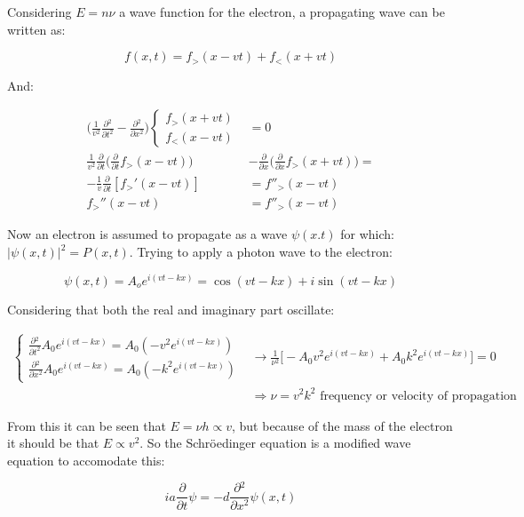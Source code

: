 Considering $E=n\nu$ a wave function for the electron, a propagating wave can be written as:

$$f(x,t) = f_>(x-vt)+f_<(x+vt)$$

And:

\begin{align*}
  \biggl(\frac{1}{v^2}\frac{\partial {^2}}{\partial {t^2}}-\frac{\partial {^2}}{\partial {x^2}}\biggr)\begin{cases}f_>(x+vt)\\f_<(x-vt)\end{cases} &= 0\\
  \frac{1}{v^2}\frac{\partial {}}{\partial {t}}\biggl(\frac{\partial {}}{\partial {t}}f_>(x-vt)\biggr)&-\frac{\partial {}}{\partial {x}}\biggl(\frac{\partial {}}{\partial {x}}f_>(x+vt)\biggr)=\\
  -\frac{1}{v}\frac{\partial {}}{\partial {t}}[f_>'(x-vt)]&=f''_>(x-vt)\\
  f_>''(x-vt) &=f''_>(x-vt)
\end{align*}

Now an electron is assumed to propagate as a wave $\psi(x.t)$ for which: $|\psi(x,t)|^2 = P(x,t)$.
Trying to apply a photon wave to the electron:

$$\psi(x,t) = A_oe^{i(vt-kx)} = \cos(vt-kx) + i\sin(vt - kx)$$

Considering that both the real and imaginary part oscillate:

\begin{align*}
  \begin{cases}\frac{\partial {^2}}{\partial {t^2}}A_0e^{i(vt-kx)} = A_0(-v^2e^{i(vt-kx)})\\\frac{\partial {^2}}{\partial {x^2}}A_0e^{i(vt-kx)} = A_0(-k^2e^{i(vt-kx)})\end{cases}&\rightarrow \frac{1}{\nu^2}\biggl[-A_0v^2e^{i(vt-kx)}+A_0k^2e^{i(vt-kx)}\biggr] = 0\\
                                                                                                                                                                                  &\Rightarrow \nu = v^2k^2\text{ frequency or velocity of propagation}
\end{align*}

From this it can be seen that $E=\nu h\propto v$, but because of the mass of the electron it should be that $E\propto v^2$.
So the Schr\"oedinger equation is a modified wave equation to accomodate this:

$$ia \frac{\partial {}}{\partial {t}}\psi=-d \frac{\partial {^2}}{\partial {x^2}}\psi(x,t)$$

